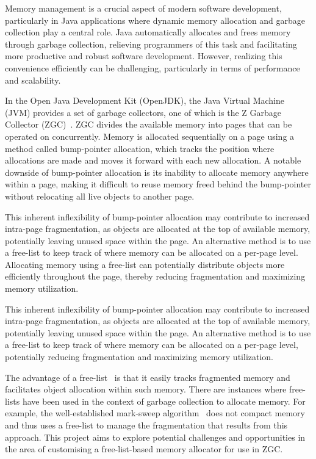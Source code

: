 
Memory management is a crucial aspect of modern software development, particularly in Java applications where dynamic memory allocation and garbage collection play a central role. Java automatically allocates and frees memory through garbage collection, relieving programmers of this task and facilitating more productive and robust software development. However, realizing this convenience efficiently can be challenging, particularly in terms of performance and scalability.

In the Open Java Development Kit (OpenJDK), the Java Virtual Machine (JVM) provides a set of garbage collectors, one of which is the Z Garbage Collector (ZGC)~\cite{zgc}. ZGC divides the available memory into pages that can be operated on concurrently. Memory is allocated sequentially on a page using a method called bump-pointer allocation, which tracks the position where allocations are made and moves it forward with each new allocation. A notable downside of bump-pointer allocation is its inability to allocate memory anywhere within a page, making it difficult to reuse memory freed behind the bump-pointer without relocating all live objects to another page.

This inherent inflexibility of bump-pointer allocation may contribute to increased intra-page fragmentation, as objects are allocated at the top of available memory, potentially leaving unused space within the page. An alternative method is to use a free-list to keep track of where memory can be allocated on a per-page level. Allocating memory using a free-list can potentially distribute objects more efficiently throughout the page, thereby reducing fragmentation and maximizing memory utilization.

This inherent inflexibility of bump-pointer allocation may contribute to increased intra-page fragmentation, as objects are allocated at the top of available memory, potentially leaving unused space within the page. An alternative method is to use a free-list to keep track of where memory can be allocated on a per-page level, potentially reducing fragmentation and maximizing memory utilization.

The advantage of a free-list~\cite{gchandbook} is that it easily tracks fragmented memory and facilitates object allocation within such memory. There are instances where free-lists have been used in the context of garbage collection to allocate memory. For example, the well-established mark-sweep algorithm~\cite{gchandbook} does not compact memory and thus uses a free-list to manage the fragmentation that results from this approach. This project aims to explore potential challenges and opportunities in the area of customising a free-list-based memory allocator for use in ZGC.

